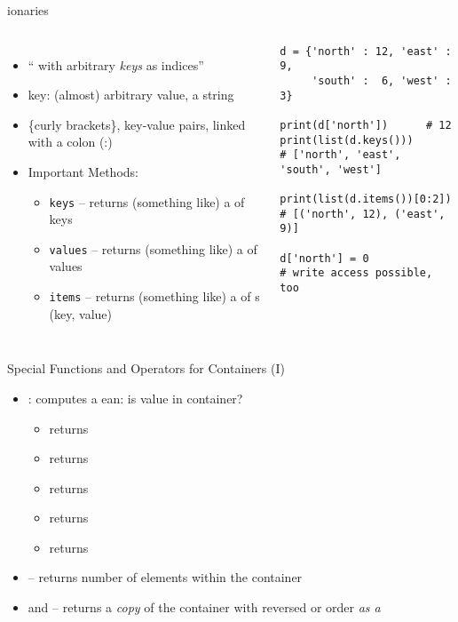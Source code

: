 \begin{frame}[fragile]{ionaries}
%
\begin{columns}[T]
\begin{itemize}
\item \enquote{ with arbitrary \emph{keys} as indices}
\item key: (almost) arbitrary value, \eg a string
\item \{curly brackets\}, key-value pairs, linked with a colon (:)
\item Important Methods:
	\begin{itemize}
	\item \texttt{keys} -- returns (something like) a  of keys
	\item \texttt{values} -- returns (something like) a  of values
	\item \texttt{items} -- returns (something like) a  of s (key, value)
	\end{itemize}
\end{itemize}
%
\begin{codebox}
\begin{verbatim}
d = {'north' : 12, 'east' : 9,
     'south' :  6, 'west' : 3}

print(d['north'])      # 12
print(list(d.keys()))
# ['north', 'east', 'south', 'west']

print(list(d.items())[0:2])
# [('north', 12), ('east', 9)]

d['north'] = 0
# write access possible, too
\end{verbatim}
\end{codebox}
\end{columns}
%
\end{frame}


\begin{frame}[fragile]{Special Functions and Operators for Containers (I)}
%
\begin{itemize}
\item {}: computes a ean: is value in container?
	\begin{itemize}
	\item \inPy{1 in [1, 2, 3]} returns 
	\item {} returns 
	\item {} returns 
	\item {} returns 
	\item {} returns 
	\end{itemize}
\item {} -- returns number of elements within the container
\item {} and  -- returns a \emph{copy} of the container with reversed or order \emph{as a }
\end{itemize}
%
\end{frame}

